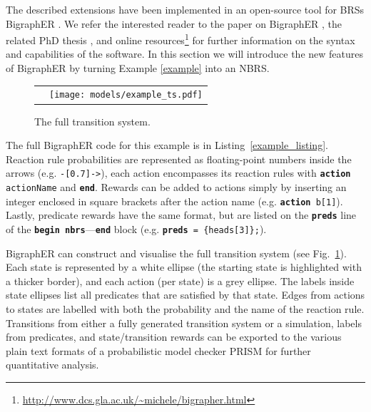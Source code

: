 \documentclass[runningheads]{llncs}
\begin{document}
The described extensions have been implemented in an open-source tool for BRSs
BigraphER \cite{DBLP:conf/cav/SevegnaniC16}. We refer the interested reader to
the paper on BigraphER \cite{DBLP:conf/cav/SevegnaniC16}, the related PhD thesis
\cite{DBLP:phd/ethos/Sevegnani12}, and online
resources\footnote{\url{http://www.dcs.gla.ac.uk/~michele/bigrapher.html}} for
further information on the syntax and capabilities of the software. In this
section we will introduce the new features of BigraphER by turning Example
\ref{example} into an NBRS.

\begin{figure}
  \centering
  \begin{tabular}{p{}p{}}
    \begin{minipage}{0.5\textwidth}
      \centering
      
    \end{minipage}
    &
      \begin{minipage}{0.5\textwidth}
        \centering
        \vspace{12mm}
        \texttt{[image: models/example\_ts.pdf]}
        \caption{The full transition system.}
        \label{example_ts}
      \end{minipage}
  \end{tabular}
\end{figure}

The full BigraphER code for this example is in Listing~\ref{example_listing}.
Reaction rule probabilities are represented as floating-point numbers inside the
arrows (e.g. \texttt{-[0.7]->}), each action encompasses its reaction rules with
\texttt{\textbf{action} actionName} and \texttt{\textbf{end}}. Rewards can be
added to actions simply by inserting an integer enclosed in square brackets
after the action name (e.g. \texttt{\textbf{action} b[1]}). Lastly, predicate
rewards have the same format, but are listed on the \texttt{\textbf{preds}} line
of the \texttt{\textbf{begin nbrs}}---\texttt{\textbf{end}} block (e.g.
\texttt{\textbf{preds} = \{heads[3]\};}).

BigraphER can construct and visualise the full transition system (see
Fig.~\ref{example_ts}). Each state is represented by a white ellipse (the
starting state is highlighted with a thicker border), and each action (per
state) is a grey ellipse. The labels inside state ellipses list all predicates
that are satisfied by that state. Edges from actions to states are labelled with
both the probability and the name of the reaction rule. Transitions from either
a fully generated transition system or a simulation, labels from predicates, and
state/transition rewards can be exported to the various plain text formats of a
probabilistic model checker PRISM \cite{DBLP:conf/cav/KwiatkowskaNP11} for
further quantitative analysis.
\end{document}
